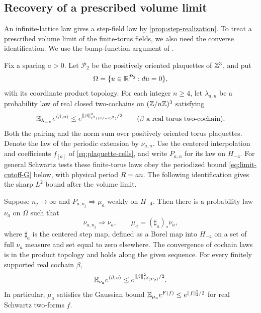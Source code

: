 \subsection{Recovery of a prescribed volume limit}
\label{subsec:fixed-spacing-recovery}\label{sec:recovery}
An infinite-lattice law gives a step-field law by
\cref{prop:step-realization}. To treat a prescribed volume limit
of the finite-torus fields, we also need the converse
identification. We use the bump-function argument of
\cite[Section~6.4]{QED3Manuscript}.

Fix a spacing $a>0$. Let $\mathcal P_2$ be the positively oriented
plaquettes of $\mathbb Z^3$, and put
\[
 \Omega=\{u\in\mathbb R^{\mathcal P_2}:du=0\},
\]
with its coordinate product topology. For each integer $n\ge4$,
let $\lambda_{a,n}$ be a probability law of real closed
two-cochains on $(\mathbb Z/n\mathbb Z)^3$ satisfying
\begin{equation}\label{eq:recovery-finite-gaussian}
 \mathbb E_{\lambda_{a,n}}e^{\langle\beta,u\rangle}
 \le e^{\|\beta\|_{\ell^2((\mathbb Z/n\mathbb Z)^3)}^2/2}
 \qquad(\beta\text{ a real torus two-cochain}).
\end{equation}
Both the pairing and the norm sum over positively oriented torus
plaquettes. Denote the law of the periodic extension by
$\nu_{a,n}$. Use the centered interpolation and coefficients
$f_{[a]}$ of \eqref{eq:plaquette-cells}, and write $P_{a,n}$
for its law on $H_{-4}$.
For general Schwartz tests these finite-torus laws obey the
periodized bound \eqref{eq:limit-cutoff-G} below, with physical
period $R=an$. The following identification gives the sharp
$L^2$ bound after the volume limit.

\begin{proposition}\label{prop:fixed-spacing-recovery}
Suppose $n_j\to\infty$ and $P_{a,n_j}\Longrightarrow\mu_a$
weakly on $H_{-4}$. Then there is a probability law $\nu_a$
on $\Omega$ such that
\begin{equation}\label{eq:limit-volume-identification}
 \nu_{a,n_j}\Longrightarrow\nu_a,\qquad
 \mu_a=(\sharp_a)_*\nu_a,
\end{equation}
where $\sharp_a$ is the centered step map, defined as a Borel
map into $H_{-4}$ on a set of full $\nu_a$ measure and set
equal to zero elsewhere. The convergence of cochain laws is
in the product topology and holds along the given sequence.
For every finitely supported real cochain $\beta$,
\begin{equation}\label{eq:limit-lattice-G}
 \mathbb E_{\nu_a}e^{\langle\beta,u\rangle}
 \le e^{\|\beta\|_{\ell^2(\mathcal P_2)}^2/2}.
\end{equation}
In particular, $\mu_a$ satisfies the Gaussian bound
$\mathbb E_{\mu_a}e^{F(f)}\le e^{\|f\|_2^2/2}$ for real Schwartz
two-forms $f$.
\end{proposition}

